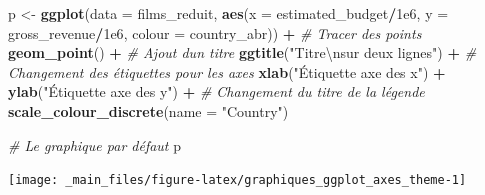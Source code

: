 \documentclass[
  11pt,
]{book}
\newenvironment{Shaded}{\begin{snugshade}}{\end{snugshade}}
\newcommand{\CharTok}[1]{\textcolor[rgb]{0.31,0.60,0.02}{#1}}
\newcommand{\CommentTok}[1]{\textcolor[rgb]{0.56,0.35,0.01}{\textit{#1}}}
\newcommand{\DataTypeTok}[1]{\textcolor[rgb]{0.13,0.29,0.53}{#1}}
\newcommand{\FloatTok}[1]{\textcolor[rgb]{0.00,0.00,0.81}{#1}}
\newcommand{\KeywordTok}[1]{\textcolor[rgb]{0.13,0.29,0.53}{\textbf{#1}}}
\newcommand{\NormalTok}[1]{#1}
\newcommand{\OperatorTok}[1]{\textcolor[rgb]{0.81,0.36,0.00}{\textbf{#1}}}
\newcommand{\StringTok}[1]{\textcolor[rgb]{0.31,0.60,0.02}{#1}}
\numberwithin{equation}{section}
\numberwithin{countremarque}{section}
\begin{document}
\begin{Shaded}
\begin{Highlighting}[]
\NormalTok{p \textless{}{-}}\StringTok{ }\KeywordTok{ggplot}\NormalTok{(}\DataTypeTok{data =}\NormalTok{ films\_reduit,}
            \KeywordTok{aes}\NormalTok{(}\DataTypeTok{x =}\NormalTok{ estimated\_budget}\OperatorTok{/}\FloatTok{1e6}\NormalTok{, }
                \DataTypeTok{y =}\NormalTok{ gross\_revenue}\OperatorTok{/}\FloatTok{1e6}\NormalTok{,}
                \DataTypeTok{colour =}\NormalTok{ country\_abr)) }\OperatorTok{+}
\StringTok{  }\CommentTok{\# Tracer des points}
\StringTok{  }\KeywordTok{geom\_point}\NormalTok{() }\OperatorTok{+}\StringTok{ }
\StringTok{  }\CommentTok{\# Ajout d\textquotesingle{}un titre}
\StringTok{  }\KeywordTok{ggtitle}\NormalTok{(}\StringTok{"Titre}\CharTok{\textbackslash{}n}\StringTok{sur deux lignes"}\NormalTok{) }\OperatorTok{+}
\StringTok{  }\CommentTok{\# Changement des étiquettes pour les axes}
\StringTok{  }\KeywordTok{xlab}\NormalTok{(}\StringTok{"Étiquette axe des x"}\NormalTok{) }\OperatorTok{+}\StringTok{ }\KeywordTok{ylab}\NormalTok{(}\StringTok{"Étiquette axe des y"}\NormalTok{) }\OperatorTok{+}
\StringTok{  }\CommentTok{\# Changement du titre de la légende}
\StringTok{  }\KeywordTok{scale\_colour\_discrete}\NormalTok{(}\DataTypeTok{name =} \StringTok{"Country"}\NormalTok{)}

\CommentTok{\# Le graphique par défaut}
\NormalTok{p}
\end{Highlighting}
\end{Shaded}

\begin{center}\texttt{[image: \_main\_files/figure-latex/graphiques\_ggplot\_axes\_theme-1]} \end{center}
\end{document}
